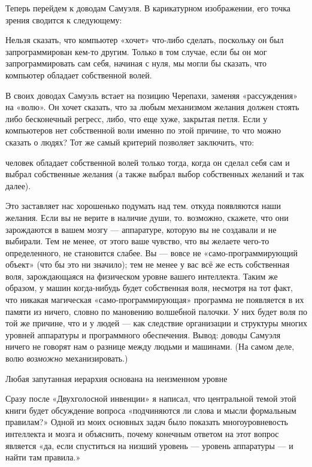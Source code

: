 \documentclass[../main.tex]{subfiles}
\begin{document}
Теперь перейдем к доводам Самуэля. В карикатурном изображении, его точка зрения сводится к следующему:

Нельзя сказать, что компьютер «хочет» что-либо сделать, поскольку он был запрограммирован кем-то другим. Только в том случае, если бы он мог запрограммировать сам себя, начиная с нуля, мы могли бы сказать, что компьютер обладает собственной волей.

В своих доводах Самуэль встает на позицию Черепахи, заменяя «рассуждения» на «волю». Он хочет сказать, что за любым механизмом желания должен стоять либо бесконечный регресс, либо, что еще хуже, закрытая петля. Если у компьютеров нет собственной воли именно по этой причине, то что можно сказать о людях? Тот же самый критерий позволяет заключить, что:

человек обладает собственной волей только тогда, когда он сделал себя сам и выбрал собственные желания (а также выбрал выбор собственных желаний и так далее).

Это заставляет нас хорошенько подумать над тем. откуда появляются наши желания. Если вы не верите в наличие души, то. возможно, скажете, что они зарождаются в вашем мозгу --- аппаратуре, которую вы не создавали и не выбирали. Тем не менее, от этого ваше чувство, что вы желаете чего-то определенного, не становится слабее. Вы --- вовсе не «само-программирующий объект» (что бы это ни значило); тем не менее у вас всё же есть собственная воля, зарождающаяся на физическом уровне вашего интеллекта. Таким же образом, у машин когда-нибудь будет собственная воля, несмотря на тот факт, что никакая магическая «само-программирующая» программа не появляется в их памяти из ничего, словно по мановению волшебной палочки. У них будет воля по той же причине, что и у людей --- как следствие организации и структуры многих уровней аппаратуры и программного обеспечения. Вывод: доводы Самуэля ничего не говорят нам о разнице между людьми и машинами. (На самом деле, волю \emph{возможно} механизировать.)

Любая запутанная иерархия основана на неизменном уровне

Сразу после «Двухголосной инвенции» я написал, что центральной темой этой книги будет обсуждение вопроса «подчиняются ли слова и мысли формальным правилам?» Одной из моих основных задач было показать многоуровневость интеллекта и мозга и объяснить, почему конечным ответом на этот вопрос является «да, если спуститься на низший уровень --- уровень аппаратуры --- и найти там правила.»
\end{document}
